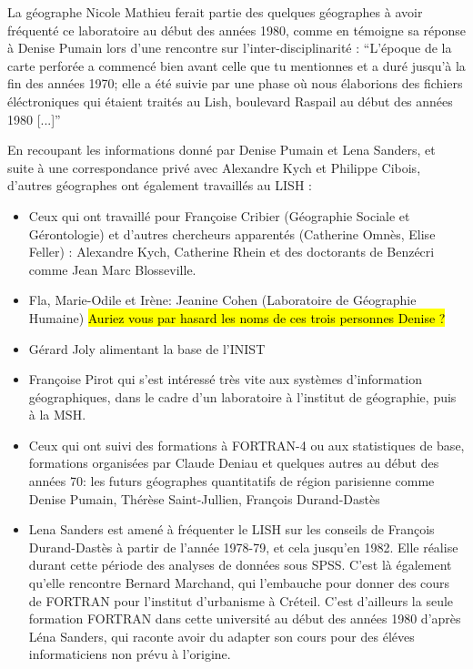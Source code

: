 La géographe Nicole Mathieu ferait partie des quelques géographes à avoir fréquenté ce laboratoire au début des années 1980, comme en témoigne sa réponse à Denise Pumain lors d'une rencontre sur l'inter-disciplinarité : \enquote{L'époque de la carte perforée a commencé bien avant celle que tu mentionnes et a duré jusqu'à la fin des années 1970; elle a été suivie par une phase où nous élaborions des fichiers éléctroniques qui étaient traités au Lish, boulevard Raspail au début des années 1980 [...]} \autocite[154]{Mathieu2014}

En recoupant les informations donné par Denise Pumain et Lena Sanders, et suite à une correspondance privé avec Alexandre Kych et Philippe Cibois, d'autres géographes ont également travaillés au LISH :

\begin{itemize}[label=\textbullet]

\item Ceux qui ont travaillé pour Françoise Cribier (Géographie Sociale et Gérontologie) et d'autres chercheurs apparentés (Catherine Omnès, Elise Feller) : Alexandre Kych, Catherine Rhein et des doctorants de Benzécri comme Jean Marc Blosseville.

\item Fla, Marie-Odile et Irène: Jeanine Cohen (Laboratoire de Géographie Humaine) \hl{Auriez vous par hasard les noms de ces trois personnes Denise ?}

\item Gérard Joly alimentant la base de l'INIST

\item Françoise Pirot qui s'est intéressé très vite aux systèmes d'information géographiques, dans le cadre d'un laboratoire à l’institut de géographie, puis à la MSH.

\item Ceux qui ont suivi des formations à FORTRAN-4 ou aux statistiques de base, formations organisées par Claude Deniau et quelques autres au début des années 70: les futurs géographes quantitatifs de région parisienne comme Denise Pumain, Thérèse Saint-Jullien, François Durand-Dastès

\item Lena Sanders est amené à fréquenter le LISH sur les conseils de François Durand-Dastès à partir de l'année 1978-79, et cela jusqu'en 1982. Elle réalise durant cette période des analyses de données sous SPSS. C'est là également qu'elle rencontre Bernard Marchand, qui l'embauche pour donner des cours de FORTRAN pour l'institut d'urbanisme à Créteil. C'est d'ailleurs la seule formation FORTRAN dans cette université au début des années 1980 d'après Léna Sanders, qui raconte avoir du adapter son cours pour des éléves informaticiens non prévu à l'origine.
\end{itemize}

